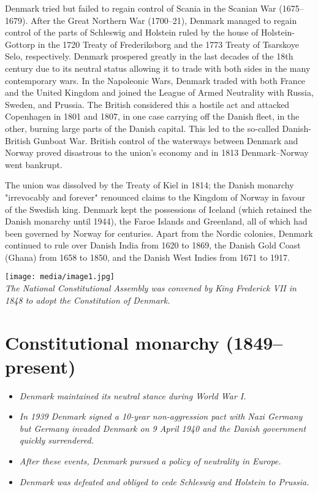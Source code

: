 Denmark tried but failed to regain control of Scania in the Scanian War
(1675--1679). After the Great Northern War (1700--21), Denmark managed
to regain control of the parts of Schleswig and Holstein ruled by the
house of Holstein-Gottorp in the 1720 Treaty of Frederiksborg and the
1773 Treaty of Tsarskoye Selo, respectively. Denmark prospered greatly
in the last decades of the 18th century due to its neutral status
allowing it to trade with both sides in the many contemporary wars. In
the Napoleonic Wars, Denmark traded with both France and the United
Kingdom and joined the League of Armed Neutrality with Russia, Sweden,
and Prussia. The British considered this a hostile act and attacked
Copenhagen in 1801 and 1807, in one case carrying off the Danish fleet,
in the other, burning large parts of the Danish capital. This led to the
so-called Danish-British Gunboat War. British control of the waterways
between Denmark and Norway proved disastrous to the union's economy and
in 1813 Denmark--Norway went bankrupt.

The union was dissolved by the Treaty of Kiel in 1814; the Danish
monarchy "irrevocably and forever" renounced claims to the Kingdom of
Norway in favour of the Swedish king. Denmark kept the possessions of
Iceland (which retained the Danish monarchy until 1944), the Faroe
Islands and Greenland, all of which had been governed by Norway for
centuries. Apart from the Nordic colonies, Denmark continued to rule
over Danish India from 1620 to 1869, the Danish Gold Coast (Ghana) from
1658 to 1850, and the Danish West Indies from 1671 to 1917.

\texttt{[image: media/image1.jpg]}\\
\emph{The National Constitutional Assembly was convened by King
Frederick VII in 1848 to adopt the Constitution of Denmark.}

\section{Constitutional monarchy
(1849--present)}\label{constitutional-monarchy-1849present}

\begin{itemize}
\item
  \emph{Denmark maintained its neutral stance during World War I.}
\item
  \emph{In 1939 Denmark signed a 10-year non-aggression pact with Nazi
  Germany but Germany invaded Denmark on 9 April 1940 and the Danish
  government quickly surrendered.}
\item
  \emph{After these events, Denmark pursued a policy of neutrality in
  Europe.}
\item
  \emph{Denmark was defeated and obliged to cede Schleswig and Holstein
  to Prussia.}
\end{itemize}

